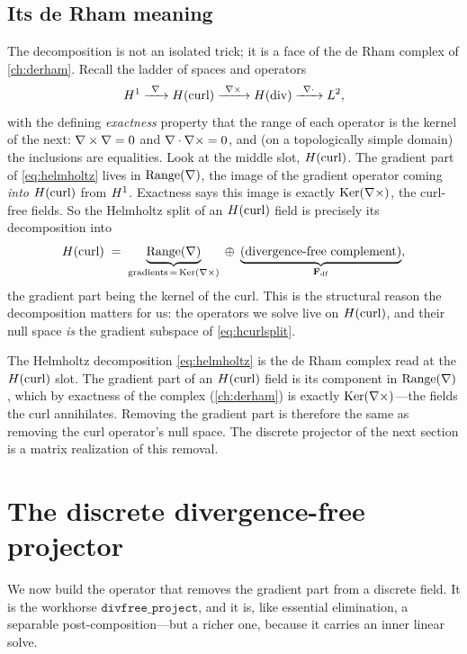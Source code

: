 \subsection{Its de Rham meaning}

The decomposition is not an isolated trick; it is a face of the de Rham complex of
\cref{ch:derham}. Recall the ladder of spaces and operators
\[
  H^1 \xrightarrow{\ \nabla\ } H(\mathrm{curl}) \xrightarrow{\ \nabla\times\ }
  H(\mathrm{div}) \xrightarrow{\ \nabla\cdot\ } L^2,
\]
with the defining \emph{exactness} property that the range of each operator is the
kernel of the next: $\nabla\times\nabla = 0$ and $\nabla\cdot\nabla\times = 0$, and (on a
topologically simple domain) the inclusions are equalities. Look at the middle
slot, $H(\mathrm{curl})$. The gradient part of \cref{eq:helmholtz} lives in
$\mathrm{Range}(\nabla)$, the image of the gradient operator coming \emph{into}
$H(\mathrm{curl})$ from $H^1$. Exactness says this image is exactly $\mathrm{Ker}(\nabla\times)$,
the curl-free fields. So the Helmholtz split of an $H(\mathrm{curl})$ field is precisely its
decomposition into
\begin{equation}
  H(\mathrm{curl}) \;=\; \underbrace{\mathrm{Range}(\nabla)}_{\text{gradients}\,=\,\mathrm{Ker}(\nabla\times)}
  \;\oplus\;
  \underbrace{(\text{divergence-free complement})}_{\mathbf{F}_{\mathrm{df}}},
  \label{eq:hcurlsplit}
\end{equation}
the gradient part being the kernel of the curl. This is the structural reason the
decomposition matters for us: the operators we solve live on $H(\mathrm{curl})$, and their
null space \emph{is} the gradient subspace of \cref{eq:hcurlsplit}.

\begin{keyidea}
The Helmholtz decomposition \cref{eq:helmholtz} is the de Rham complex read at the
$H(\mathrm{curl})$ slot. The gradient part of an $H(\mathrm{curl})$ field is its component in
$\mathrm{Range}(\nabla)$, which by exactness of the complex
(\cref{ch:derham}) is exactly $\mathrm{Ker}(\nabla\times)$---the fields the curl
annihilates. Removing the gradient part is therefore the same as removing the
curl operator's null space. The discrete projector of the next section is a
matrix realization of this removal.
\end{keyidea}

\section{The discrete divergence-free projector}
\label{sec:divfree}

We now build the operator that removes the gradient part from a discrete field.
It is the workhorse $\mathtt{divfree\_project}$, and it is, like essential
elimination, a separable post-composition---but a richer one, because it carries
an inner linear solve.


